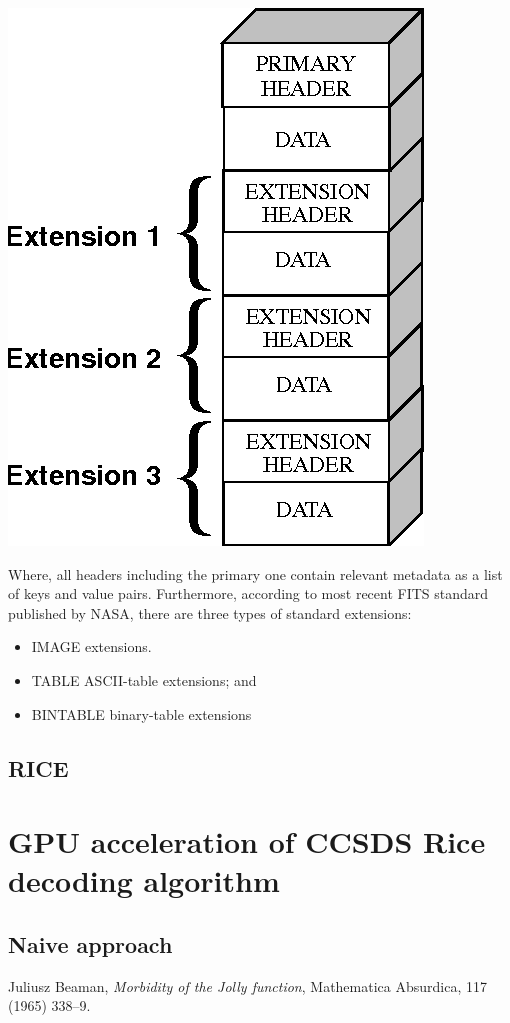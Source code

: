 \documentclass[licencjacka,en]{pracamgr}
\begin{document}
\centerline{\includegraphics[scale=0.3]{fits}}
 


Where, all headers including the primary one contain relevant metadata as a list of keys and value pairs. 
Furthermore, according to most recent FITS standard published by NASA, there are three types of standard extensions:
\begin{itemize}
	\item IMAGE extensions. 
	\item TABLE ASCII-table extensions; and
	\item BINTABLE binary-table extensions
\end{itemize}


\section{RICE}

\chapter{GPU acceleration of CCSDS Rice decoding algorithm}\label{r:losers}

\section{Naive approach}







\begin{thebibliography}{99}

	 Juliusz Beaman, \textit{Morbidity of the Jolly
		function}, Mathematica Absurdica, 117 (1965) 338--9.


\end{thebibliography}
\end{document}
